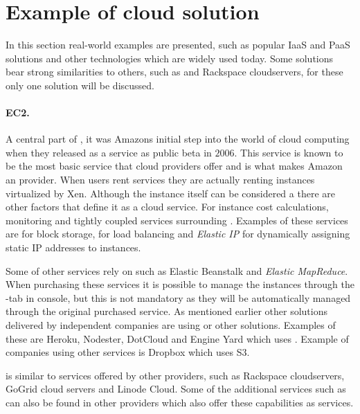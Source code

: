 \section{Example of cloud solution}

In this section real-world examples are presented, such as popular IaaS and PaaS solutions
and other technologies which are widely used today.
Some solutions bear strong similarities to others, such as  and Rackspace cloudservers,
for these only one solution will be discussed.

\paragraph{EC2.}

A central part of , it was Amazons initial step into the world of cloud computing when
they released  as a service as public beta in $2006$.
This service is known to be the most basic service that cloud providers offer and is 
what makes Amazon an  provider.
When users rent  services they are actually renting  
instances virtualized by Xen.
Although the instance itself can be considered a  there are other factors 
that define it as a cloud service.
For instance cost calculations, monitoring and tightly coupled services surrounding .
Examples of these services are  for block storage, 
 for load balancing and \emph{Elastic IP} 
for dynamically assigning static IP addresses to instances.

Some of  other services rely on  such as  Elastic Beanstalk 
and \emph{Elastic MapReduce}.
When purchasing these services it is possible to manage the  instances 
through the -tab in  console, but this is not mandatory
as they will be automatically managed through the original purchased service.
As mentioned earlier other  solutions delivered by independent companies
are using  or other  solutions.
Examples of these are Heroku, Nodester, DotCloud and Engine Yard which uses .
Example of companies using other  services is Dropbox which uses S3.

 is similar to services offered by other providers, 
such as Rackspace cloudservers, GoGrid cloud servers
and Linode Cloud.
Some of the additional services such as  can also be found in other providers
which also offer these capabilities as services.

